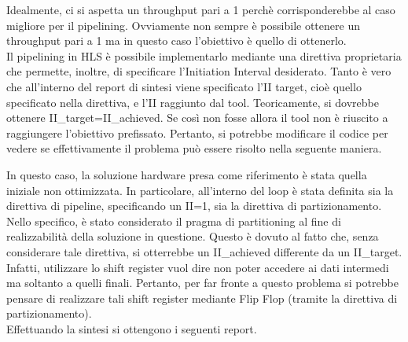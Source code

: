 Idealmente, ci si aspetta un throughput pari a 1 perchè corrisponderebbe al caso migliore per il pipelining. Ovviamente non sempre è possibile ottenere un throughput pari a 1 ma in questo caso l'obiettivo è quello di ottenerlo.
\\
Il pipelining in HLS è possibile implementarlo mediante una direttiva proprietaria che permette, inoltre, di specificare l'Initiation Interval desiderato. Tanto è vero che all'interno del report di sintesi viene specificato l'II target, cioè quello specificato nella direttiva, e l'II raggiunto dal tool. Teoricamente, si dovrebbe ottenere II\_target=II\_achieved. Se così non fosse allora il tool non è riuscito a raggiungere l'obiettivo prefissato. Pertanto, si potrebbe modificare il codice per vedere se effettivamente il problema può essere risolto nella seguente maniera. 



In questo caso, la soluzione hardware presa come riferimento è stata quella iniziale non ottimizzata. In particolare, all'interno del loop è stata definita sia la direttiva di pipeline, specificando un II=1, sia la direttiva di partizionamento. Nello specifico, è stato considerato il pragma di partitioning al fine di realizzabilità della soluzione in questione. Questo è dovuto al fatto che, senza considerare tale direttiva, si otterrebbe un II\_achieved differente da un II\_target. Infatti, utilizzare lo shift register vuol dire non poter accedere ai dati intermedi ma soltanto a quelli finali. Pertanto, per far fronte a questo problema si potrebbe pensare di realizzare tali shift register mediante Flip Flop (tramite la direttiva di partizionamento).
\\
Effettuando la sintesi si ottengono i seguenti report.

